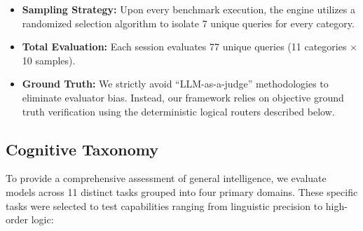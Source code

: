 \documentclass[10pt, twocolumn, a4paper]{article}
\begin{document}
\begin{itemize}
    \item \textbf{Sampling Strategy:} Upon every benchmark execution, the engine utilizes a randomized selection algorithm to isolate 7 unique queries for every category.
    \item \textbf{Total Evaluation:} Each session evaluates 77 unique queries (11 categories $\times$ 10 samples).
    \item \textbf{Ground Truth:} We strictly avoid ``LLM-as-a-judge'' methodologies to eliminate evaluator bias. Instead, our framework relies on objective ground truth verification using the deterministic logical routers described below.
\end{itemize}

\subsection{Cognitive Taxonomy}
To provide a comprehensive assessment of general intelligence, we evaluate models across 11 distinct tasks grouped into four primary domains. These specific tasks were selected to test capabilities ranging from linguistic precision to high-order logic\cite{white2025livebench}:
\end{document}
